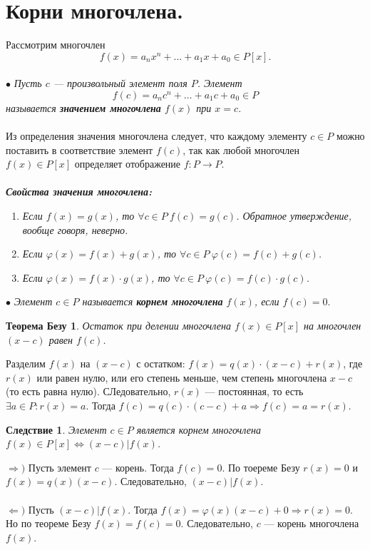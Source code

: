 \section{Корни многочлена.}
Рассмотрим многочлен $$f(x) = a_nx^n + … + a_1x + a_0 \in P[x].$$\\
$\bullet$ \textit{Пусть $c$ --- произвольный элемент поля $P$. Элемент $$f(c) = a_nc^n +\ldots+a_1c + a_0 \in P$$ называется \textbf{значением 
		многочлена} $f(x)$ при $x = c$.}\\\\
Из определения значения многочлена следует, что каждому элементу $c \in P$ можно поставить в соответствие элемент $f(c)$, так как любой многочлен $f(x) \in P[x]$ определяет отображение $f: P \rightarrow P$.\\\\
\textbf{\textit{Свойства значения многочлена:}}
\begin{enumerate}
	\item\textit{ Если $f(x) = g(x)$, то $\forall c\in P\ f(c) = g(c)$. Обратное утверждение, вообще говоря, неверно.}
	\item \textit{Если $\varphi(x) = f(x) + g(x)$, то $\forall c \in P\ \varphi(c) = f(c) + g(c)$.}
	\item \textit{Если $\varphi(x) = f(x)\cdot g(x)$, то $\forall c \in P \ \varphi(c) = f(c)\cdot g(c)$.}
\end{enumerate}
$\bullet$ \textit{Элемент $c \in P$ называется \textbf{корнем многочлена} $f(x)$, если $f(c) = 0$}.
\newtheorem*{861}{Теорема Безу}\begin{861}
	Остаток при делении многочлена $f(x)\in P[x]$ на многочлен $(x - c)$ равен $f(c)$.
\end{861}
\begin{Proof}
	Разделим $f(x)$ на $(x - c)$ с остатком: $f(x) = q(x)\cdot (x - c) + r(x)$, где $r(x)$ или равен нулю, или его степень меньше, чем степень многочлена $x - c$ (то есть равна нулю). СЛедовательно, $r(x)$ --- постоянная, то есть $\exists a \in P: r(x) = a$. Тогда $f(c) = q(c)\cdot (c - c) +a \Rightarrow f(c) = a = r(x)$.
\end{Proof}
\newtheorem*{862}{Следствие}\begin{862}
	Элемент $c \in P$ является корнем многочлена $f(x) \in P[x] \Longleftrightarrow (x - c)|f(x)$.
\end{862}
\begin{Proof}
	$\Rightarrow)$ Пусть элемент $c$ --- корень. Тогда $f(c) = 0$. По тоереме Безу $r(x) = 0$ и $f(x) = q(x)(x - c)$. Следовательно, $(x - c) | f(x)$.\\\\
	$\Leftarrow)$ Пусть $(x - c)|f(x)$. Тогда $f(x) = \varphi(x)(x - c) + 0 \Rightarrow r(x) = 0$. Но по теореме Безу $f(x) = f(c) = 0$. Следовательно, $c$ --- корень многочлена $f(x)$. 
\end{Proof}\\\\
